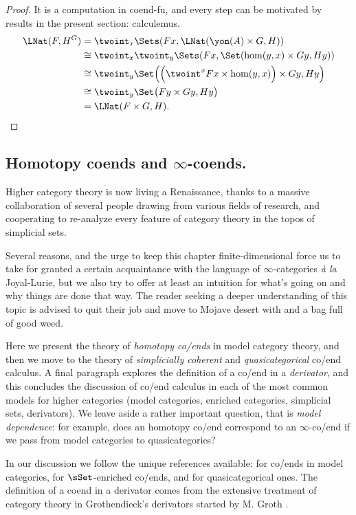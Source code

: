 \begin{proof}
It is a computation in coend-fu, and every step can be motivated by results in the present section: calculemus.
\begin{align*}
\LNat(F, H^G) &= \twoint_x \Sets(Fx, \LNat(\yon(A)\times G, H))\\
&\cong \twoint_x \twoint_y \Sets(Fx, \Set(\hom(y,x)\times Gy, Hy))\\
&\cong \twoint_y\Set\Big(\Big(\twoint^x Fx \times \hom(y,x)\Big)\times Gy, Hy \Big)\\
&\cong  \twoint_y\Set\big( Fy\times Gy, Hy \big)\\
&=\LNat(F\times G,H).\qedhere
\end{align*}
\end{proof}
\subsection{Homotopy coends and $\infty$-coends.}
Higher category theory is now living a Renaissance, thanks to a massive collaboration of several people drawing from various fields of research, and cooperating to re-analyze every feature of category theory in the topos of simplicial sets.

Several reasons, and the urge to keep this chapter finite-dimensional force us to take for granted a certain acquaintance with the language of $\infty$-categories \emph{à la} Joyal-Lurie, but we also try to offer at least an intuition for what's going on and why things are done that way. The reader seeking a deeper understanding of this topic is advised to quit their job and move to Mojave desert with \cite{HTT,Joy,Joyal2002,JoyS} and a bag full of good weed.

Here we present the theory of \emph{homotopy co/ends} in model category theory, and then we move to the theory of \emph{simplicially coherent} and \emph{quasicategorical} co/end calculus. A final paragraph explores the definition of a co/end in a \emph{derivator}, and this  concludes the discussion of co/end calculus in each of the most common models for higher categories (model categories, enriched categories, simplicial sets, derivators). We leave aside a rather important question, that is \emph{model dependence}: for example, does an homotopy co/end correspond to an $\infty$-co/end if we pass from model categories to quasicategories?

In our discussion we follow the unique references available: \cite{Isaacson} for co/ends in model categories, \cite{cordier1997homotopy} for $\sSet$-enriched co/ends, and \cite{gepner2015lax} for quasicategorical ones. The definition of a coend in a derivator comes from the extensive treatment of category theory in Grothendieck's derivators started by M\@. Groth \cite{groth2013derivators}.
